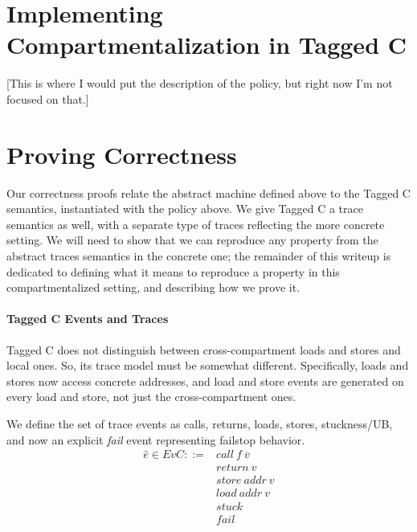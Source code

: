 \documentclass{article}
\begin{document}
\begin{comment}
Writing properties out in the ad-hoc format above is challenging. More user-friendly approaches include
domain-specific languages like linear temporal logic. It's also easy to get them wrong!
Proving or otherwise enforcing a weak property will be little comfort on seeing the missiles fly.
But even without proving or even rigorously defining a specific property of interest,
the abstract semantics matches the intuitive behavior of programs, so as long as the abstract
semantics are reproduced in our concrete implementation, observers examining this
code can reason about its behavior in different scenarios and convince themselves that it is secure.
\end{comment}

\section{Implementing Compartmentalization in Tagged C}

[This is where I would put the description of the policy, but right now I'm not focused on that.]

\section{Proving Correctness}

Our correctness proofs relate the abstract machine defined above to the Tagged C semantics,
instantiated with the policy above. We give Tagged C a trace semantics
as well, with a separate type of traces reflecting the more concrete setting. We will need to
show that we can reproduce any property from the abstract traces semantics in the concrete one;
the remainder of this writeup is dedicated to defining what it means to reproduce a property
in this compartmentalized setting, and describing how we prove it.

\paragraph{Tagged C Events and Traces}

Tagged C does not distinguish between cross-compartment loads and stores and local ones.
So, its trace model must be somewhat different. Specifically, loads and stores now access
concrete addresses, and load and store events are generated on every load and store, not just the
cross-compartment ones.

We define the set of trace events as calls, returns, loads, stores, stuckness/UB, and now an
explicit {\em fail} event representing failstop behavior.
\[\begin{split}
\hat{e} \in EvC ::= & \mathit{call} ~ f ~ \overline{v} \\
& \mathit{return} ~ v \\
& \mathit{store} ~ \mathit{addr} ~ v \\
& \mathit{load} ~ \mathit{addr} ~ v \\
& \mathit{stuck} \\
& \mathit{fail} \\
\end{split}\]
\end{document}
